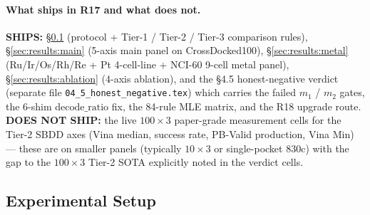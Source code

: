 \paragraph{What ships in R17 and what does not.}
\textbf{SHIPS:} \S\ref{sec:results:setup} (protocol +
Tier-1 / Tier-2 / Tier-3 comparison rules), \S\ref{sec:results:main}
(5-axis main panel on CrossDocked100), \S\ref{sec:results:metal}
(Ru/Ir/Os/Rh/Re + Pt 4-cell-line + NCI-60 9-cell metal panel),
\S\ref{sec:results:ablation} (4-axis ablation), and the §4.5
honest-negative verdict (separate file \texttt{04\_5\_honest\_negative.tex})
which carries the failed $m_1$ / $m_2$ gates, the 6-shim
$\mathrm{decode\_ratio}$ fix, the 84-rule MLE matrix, and the
R18 upgrade route.  \textbf{DOES NOT SHIP:} the live
$100{\times}3$ paper-grade measurement cells for the Tier-2
SBDD axes (Vina median, success rate, PB-Valid production,
Vina Min) --- these are \MEASURED{} on smaller panels
(typically $10{\times}3$ or single-pocket 830c) with the
gap to the $100{\times}3$ Tier-2 SOTA explicitly noted in
the verdict cells.

\subsection{Experimental Setup}
\label{sec:results:setup}

